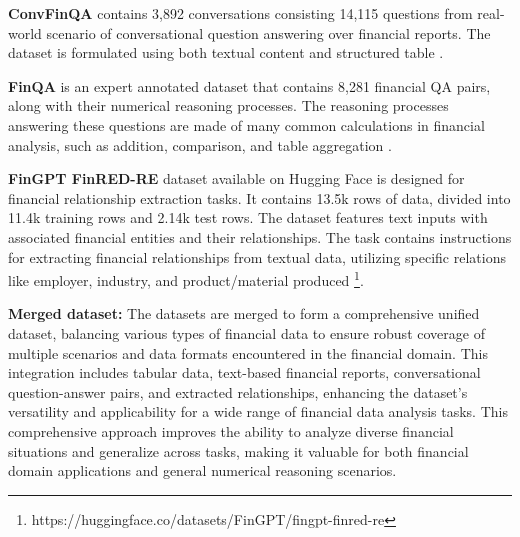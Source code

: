 \documentclass[logo,msc]{infthesis}           %
\begin{document}
\textbf{ConvFinQA } contains 3,892 conversations consisting 14,115 questions from real-world scenario of conversational question answering over financial reports. The dataset is formulated using both textual content and structured table \cite{chen2022ConvFinQA}. 

\textbf{FinQA} is an expert annotated dataset that contains 8,281 financial QA pairs, along with their numerical reasoning processes. The reasoning processes answering these questions are made of many common calculations in financial analysis, such as addition, comparison, and table aggregation \cite{chen2021finqa}. 

\textbf{FinGPT FinRED-RE } dataset available on Hugging Face is designed for financial relationship extraction tasks. It contains 13.5k rows of data, divided into 11.4k training rows and 2.14k test rows. The dataset features text inputs with associated financial entities and their relationships. The task contains instructions for extracting financial relationships from textual data, utilizing specific relations like employer, industry, and product/material produced \footnote{https://huggingface.co/datasets/FinGPT/fingpt-finred-re}. 

\textbf{Merged dataset: } The datasets are merged to form a comprehensive unified dataset, balancing various types of financial data to ensure robust coverage of multiple scenarios and data formats encountered in the financial domain. This integration includes tabular data, text-based financial reports, conversational question-answer pairs, and extracted relationships, enhancing the dataset's versatility and applicability for a wide range of financial data analysis tasks. This comprehensive approach improves the ability to analyze diverse financial situations and generalize across tasks, making it valuable for both financial domain applications and general numerical reasoning scenarios.
\end{document}
